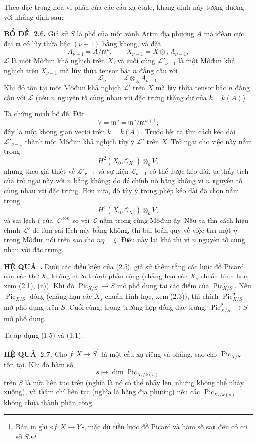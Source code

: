 \documentclass[11pt,twoside,openany]{book}
\numberwithin{equation}{section}
\newcommand{\src}[1]{%
  \phantomsection\hypertarget{src:\fgasourceid:#1}{}%
  \marginpar{\raggedleft\footnotesize\sffamily #1}%
}
\newcommand{\fgasourceid}{unset}
\newcommand{\result}[2]{\par\medskip\noindent\textbf{#1\if\relax\detokenize{#2}\relax\else\ #2\fi.}\quad}
\begin{document}
Theo đặc trưng hóa vi phân của các cấu xạ étale, khẳng định này tương đương với
khẳng định sau:

\result{BỔ ĐỀ}{2.6} Giả sử $S$ là phổ của một vành Artin địa phương $A$ mà
iđêan cực đại $\mathfrak m$ có lũy thừa bậc $(\nu+1)$ bằng không, và đặt
\[
A_{\nu-1}=A/\mathfrak m^\nu,
\qquad X_{\nu-1}=X\otimes_A A_{\nu-1},
\]
$\mathcal L$ là một Môđun khả nghịch trên $X$, và cuối cùng
$\mathcal L'_{\nu-1}$ là một Môđun khả nghịch trên $X_{\nu-1}$ mà lũy thừa
tensor bậc $n$ đẳng cấu với
\[
\mathcal L_{\nu-1}=\mathcal L\otimes_A A_{\nu-1}.
\]
Khi đó tồn tại một Môđun khả nghịch $\mathcal L'$ trên $X$ mà lũy thừa tensor
bậc $n$ đẳng cấu với $\mathcal L$ (nếu $n$ nguyên tố cùng nhau với đặc trưng
thặng dư của $k=k(A)$).

Ta chứng minh bổ đề. Đặt
\[
V=\mathfrak m^\nu=\mathfrak m^\nu/\mathfrak m^{\nu+1} ;
\]
đây là một không gian vectơ trên $k=k(A)$. Trước hết ta tìm cách kéo dài
$\mathcal L'_{\nu-1}$ thành một Môđun khả nghịch tùy ý $\mathcal L'$ trên
$X$. Trở ngại cho việc này nằm trong
\[
H^2(X_0,\mathcal O_{X_0})\otimes_k V,
\]
nhưng theo giả thiết về $\mathcal L'_{\nu-1}$ và sự kiện
$\mathcal L_{\nu-1}$ có thể được kéo dài, ta thấy tích của trở ngại này với
$n$ bằng không; do đó chính nó bằng không vì $n$ nguyên tố cùng nhau với đặc
trưng. Hơn nữa, độ tùy ý trong phép kéo dài đã chọn nằm trong
\[
H^1(X_0,\mathcal O_{X_0})\otimes_k V,
\]
và sai lệch $\xi$ của $\mathcal L'^{\otimes n}$ so với $\mathcal L$ nằm trong
cùng Môđun ấy. Nếu ta tìm cách hiệu chỉnh $\mathcal L'$ để làm sai lệch này
bằng không, thì bài toán quy về việc tìm một $\eta$ trong Môđun nói trên sao
cho $n\eta=\xi$. Điều này lại khả thi vì $n$ nguyên tố cùng nhau với đặc
trưng.

\result{HỆ QUẢ}{} Dưới các điều kiện của (2.5), giả sử thêm rằng các lược đồ
Picard của các thớ $X_s$ không chứa thành phần cộng (chẳng hạn các $X_s$ chuẩn
hình học, xem (2.1), (ii)). Khi đó
$\operatorname{Pic}_{X/S}\longrightarrow S$ mở phổ dụng tại các điểm của
$\operatorname{Pic}_{X/S}^\circ$. Nếu $\operatorname{Pic}_{X/S}^\circ$ đóng
(chẳng hạn các $X_s$ chuẩn hình học, xem (2.3)), thì chính
$\operatorname{Pic}_{X/S}^\sigma$ mở phổ dụng trên $S$. Cuối cùng, trong
trường hợp đồng đặc trưng, $\operatorname{Pic}_{X/S}^\rho\longrightarrow S$
mở phổ dụng.

Ta áp dụng (1.5) và (1.1).
\src{234}
\result{HỆ QUẢ}{2.7} Cho $f:X\longrightarrow S$\footnote{Bản in ghi
«$f:X\longrightarrow Y$», mặc dù tiền lược đồ Picard và hàm số sau đều có cơ
sở $S$.} là một cấu xạ riêng và phẳng, sao cho $\operatorname{Pic}_{X/S}$ tồn
tại. Khi đó hàm số
\[
s\longmapsto\dim\operatorname{Pic}_{X_s/k(s)}
\]
trên $S$ là nửa liên tục trên (nghĩa là nó có thể nhảy lên, nhưng không thể
nhảy xuống), và thậm chí liên tục (nghĩa là hằng địa phương) nếu các
$\operatorname{Pic}_{X_s/k(s)}$ không chứa thành phần cộng.
\end{document}
